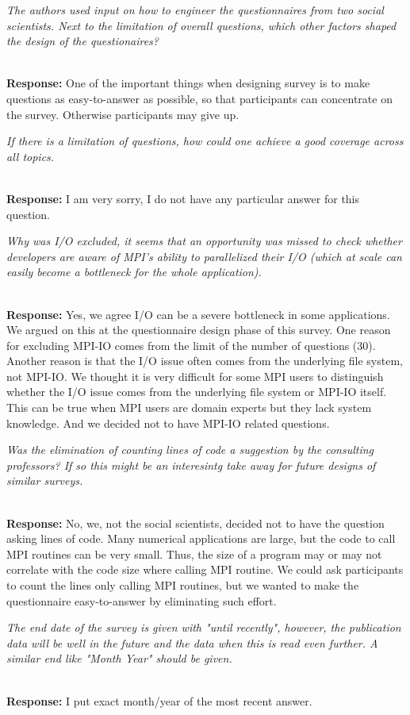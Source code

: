 \documentclass[11pt]{article}
\newcommand{\iresponse}[2]{{\item \em #1}\\%
  {\bf Response:} #2}
\begin{document}
\begin{enumerate}
\iresponse{The authors used input on how to engineer the questionnaires
  from two social scientists. Next to the limitation of overall
  questions, which other factors shaped the design of the
  questionaires?}
{One of the important things when designing survey is to make
  questions as easy-to-answer as possible, so that participants can
  concentrate on the survey. Otherwise participants may give up.}

\iresponse{If there is a limitation of questions, how could one
  achieve a good coverage across all topics.}
{I am very sorry, I do not have any particular answer for this question.}

\iresponse{Why was I/O excluded, it seems that an opportunity was
  missed to check whether developers are aware of MPI's ability to
  parallelized their I/O (which at scale can easily become a
  bottleneck for the whole application).} 
{
Yes, we agree I/O can be a severe bottleneck in some applications. We
argued on this at the questionnaire design phase of this survey. One
reason for excluding MPI-IO comes from the limit of the number of
questions (30). Another reason is that the I/O issue often comes from
the underlying file system, not MPI-IO. We thought it is very
difficult for some MPI users to distinguish whether the I/O issue comes
from the underlying file system or MPI-IO itself. This can be true
when MPI users are domain experts but they lack system knowledge. And
we decided not to have MPI-IO related questions.
}

\iresponse{Was the elimination of counting lines of code a suggestion
  by the consulting professors? If so this might be an interesintg
  take away for future designs of similar surveys.}
{
No, we, not the social scientists, decided not to have the question
asking lines of code. Many numerical applications are large, but the
code to call MPI routines can be very small. Thus, the size of a
program may or may not correlate with the code size where calling MPI
routine. We could ask participants to count the lines only calling MPI
routines, but we wanted to make the questionnaire easy-to-answer by
eliminating such effort. 
}

\iresponse{The end date of the survey is given with "until recently",
  however, the publication data will be well in the future and the
  data when this is read even further. A similar end like "Month Year"
  should be given.}
{I put exact month/year of the most recent answer.}


\end{enumerate}
\end{document}
